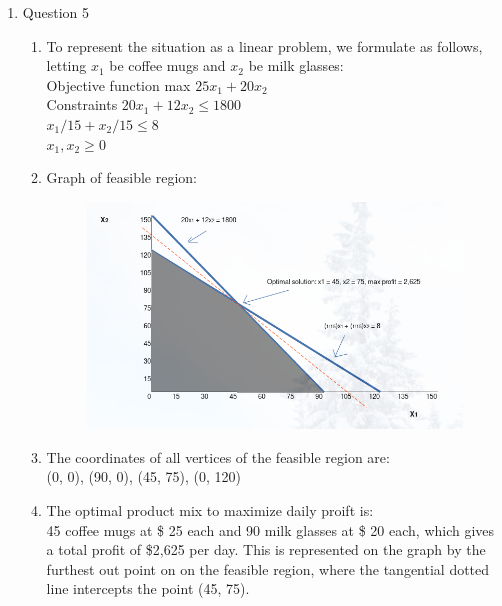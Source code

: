 \documentclass{article}
\newcommand\tab[1][1cm]{\hspace*{#1}}
\begin{document}
\begin{enumerate}
\begin{enumerate}
    \end{enumerate}

  \item Question 5
      \begin{enumerate}
        \item To represent the situation as a linear problem, we formulate as follows, letting 
          $x_{1}$ be coffee mugs and $x_{2}$ be milk glasses:\\
          \tab Objective function \tab max $25x_{1}+20x_{2}$  \\
          \tab Constraints \tab \tab $20x_{1}+12x_{2} \leq 1800$  \\
          \tab \tab \tab \tab \tab $x_{1}/15+x_{2}/15 \leq 8$\\
          \tab \tab \tab \tab \tab $x_{1},x_{2} \geq 0$\\


        \item Graph of feasible region:
          \begin{figure}[h]
            \centering
        \includegraphics[scale=.6]{feasiblegraph3.png}
        \end{figure}
    
        \item The coordinates of all vertices of the feasible region are:\\
          (0, 0), (90, 0), (45, 75), (0, 120)

        \item The optimal product mix to maximize daily proift is:\\
          45 coffee mugs at \$ 25 each and 90 milk glasses at \$ 20 each, which 
          gives a total profit of \$2,625 per day.
          This is represented on the graph by the furthest out point on on the 
          feasible region, where the tangential dotted line intercepts the point
          (45, 75).

      \end{enumerate}

\end{enumerate}
\end{document}
